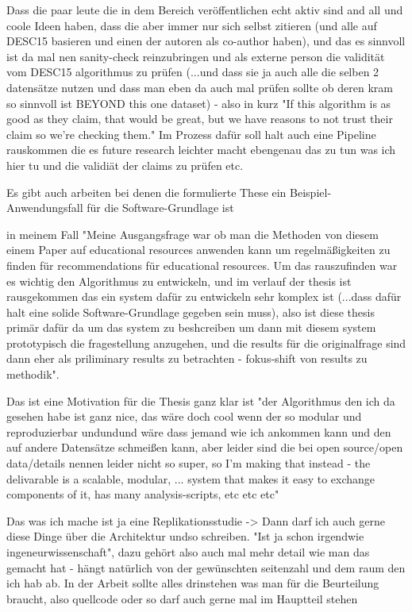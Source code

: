 \documentclass[11pt,
  paper=a4, 
  twoside,  %
  hidelinks,
  bibliography=totocnumbered,
	captions=tableheading,
	BCOR=10mm
]{scrreprt}
\theoremstyle{definition}
\begin{document}
Dass die paar leute die in dem Bereich veröffentlichen echt aktiv sind and all und coole Ideen haben, dass die aber immer nur sich selbst zitieren (und alle auf DESC15 basieren und einen der autoren als co-author haben), und das es sinnvoll ist da mal nen sanity-check reinzubringen und als externe person die validität vom DESC15 algorithmus zu prüfen (...und dass sie ja auch alle die selben 2 datensätze nutzen und dass man eben da auch mal prüfen sollte ob deren kram so sinnvoll ist BEYOND this one dataset) - also in kurz "If this algorithm is as good as they claim, that would be great, but we have reasons to not trust their claim so we're checking them." Im Prozess dafür soll halt auch eine Pipeline rauskommen die es future research leichter macht ebengenau das zu tun was ich hier tu und die validiät der claims zu prüfen etc.

Es gibt auch arbeiten bei denen die formulierte These ein Beispiel-Anwendungsfall für die Software-Grundlage ist

in meinem Fall "Meine Ausgangsfrage war ob man die Methoden von diesem einem Paper auf educational resources anwenden kann um regelmäßigkeiten zu finden für recommendations für educational resources. Um das rauszufinden war es wichtig den Algorithmus zu entwickeln, und im verlauf der thesis ist rausgekommen das ein system dafür zu entwickeln sehr komplex ist (...dass dafür halt eine solide Software-Grundlage gegeben sein muss), also ist diese thesis primär dafür da um das system zu beshcreiben um dann mit diesem system prototypisch die fragestellung anzugehen, und die results für die originalfrage sind dann eher als priliminary results zu betrachten - fokus-shift von results zu methodik".

Das ist eine Motivation für die Thesis ganz klar ist "der Algorithmus den ich da gesehen habe ist ganz nice, das wäre doch cool wenn der so modular und reproduzierbar undundund wäre dass jemand wie ich ankommen kann und den auf andere Datensätze schmeißen kann, aber leider sind die bei open source/open data/details nennen leider nicht so super, so I'm making that instead - the delivarable is a scalable, modular, ... system that makes it easy to exchange components of it, has many analysis-scripts, etc etc etc" 

Das was ich mache ist ja eine Replikationsstudie -> Dann darf ich auch gerne diese Dinge über die Architektur undso schreiben. "Ist ja schon irgendwie ingeneurwissenschaft", dazu gehört also auch mal mehr detail wie man das gemacht hat - hängt natürlich von der gewünschten seitenzahl und dem raum den ich hab ab. In der Arbeit sollte alles drinstehen was man für die Beurteilung braucht, also quellcode oder so darf auch gerne mal im Hauptteil stehen
\end{document}
